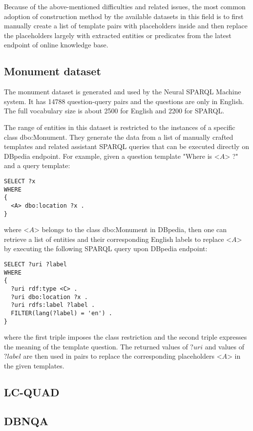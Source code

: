 Because of the above-mentioned difficulties and related issues, the most common adoption of construction method by the available datasets in this field is to first manually create a list of template pairs with placeholders inside and then replace the placeholders largely with extracted entities or predicates from the latest endpoint of online knowledge base.

\subsection{Monument dataset}

The monument dataset is generated and used by the Neural SPARQL Machine \cite{Soru2018a} system. It has 14788 question-query pairs and the questions are only in English. The full vocabulary size is about 2500 for English and 2200 for SPARQL.

The range of entities in this dataset is restricted to the instances of a specific class dbo:Monument. They generate the data from a list of manually crafted templates and related assistant SPARQL queries that can be executed directly on DBpedia endpoint. For example, given a question template "Where is <$ A $> ?" and a query template:
\begin{lstlisting}[language=SPARQL]
SELECT ?x
WHERE
{ 
  <A> dbo:location ?x . 
}
\end{lstlisting}
where <$ A $> belongs to the class dbo:Monument in DBpedia, then one can retrieve a list of entities and their corresponding English labels to replace <$ A $> by executing the following SPARQL query upon DBpedia endpoint:
\begin{lstlisting}[language=SPARQL]
SELECT ?uri ?label
WHERE
{ 
  ?uri rdf:type <C> .
  ?uri dbo:location ?x . 
  ?uri rdfs:label ?label .
  FILTER(lang(?label) = 'en') .
}
\end{lstlisting}
where the first triple imposes the class restriction and the second triple expresses the meaning of the template question. The returned values of $ ?uri $ and values of $ ?label $ are then used in pairs to replace the corresponding placeholders <$ A $> in the given templates.

\subsection{LC-QUAD}

\subsection{DBNQA}



